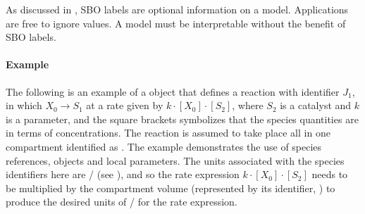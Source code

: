 As discussed in , SBO labels are optional
information on a model.  Applications are free to ignore
 values.  A model must be interpretable without the
benefit of SBO labels.


\paragraph{Example}

The following is an example of a \Reaction object that defines a
reaction with identifier $J_1$, in which $X_0 \rightarrow S_1$ at
a rate given by $k \cdot [X_0] \cdot [S_2]$, where $S_2$ is a
catalyst and $k$ is a parameter, and the square brackets
symbolizes that the species quantities are in terms of
concentrations.  The reaction is assumed to take place all in one
compartment identified as .  The example demonstrates the
use of species references, \KineticLaw objects and local
parameters.  The units associated with the species identifiers
here are / (see
), and so the rate expression $k \cdot
[X_0] \cdot [S_2]$ needs to be multiplied by the compartment
volume (represented by its identifier, ) to produce the
desired units of / for the rate
expression.


